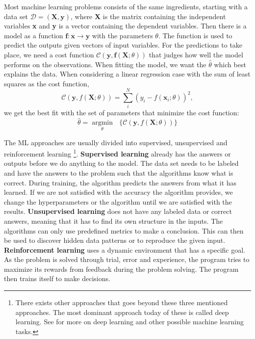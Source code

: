 \documentclass[a4paper, american, 12pt]{report}
\DeclareMathOperator*{\argmin}{argmin}
\begin{document}
	Most machine learning problems consists of the same ingredients, starting with a data set $\mathcal{D}=(\textbf{X}, \textbf{y})$, where \textbf{X} is the matrix containing the independent variables \textbf{x} and \textbf{y} is a vector containing the dependent variables. Then there is a model as a function $\textbf{f}:\textbf{x}\rightarrow\textbf{y}$ with the parameters $\theta$. The function is used to predict the outputs given vectors of input variables. For the predictions to take place, we need a cost function $\mathcal{C}(\textbf{y},\textbf{f}(\textbf{X};\theta))$ that judges how well the model performs on the observations. When fitting the model, we want the $\hat{\theta}$ which best explains the data. When considering a linear regression case with the sum of least squares as the cost function,
	\begin{equation}
	\label{eq:SumLeastSquares}
		\mathcal{C}(\textbf{y},f(\textbf{X};\theta))=\sum_{i}^{N}(y_i-f(\textbf{x}_i;\theta))^2,
	\end{equation}
	we get the best fit with the set of parameters that minimize the cost function:
	\begin{equation}
	\label{eq:MinCostFunc}
		\hat{\theta}=\underset{\theta}{\argmin}\text{ } \{\mathcal{C}(\textbf{y},f(\textbf{X};\theta))\}
	\end{equation}
	
	The ML approaches are usually divided into supervised, unsupervised and reinforcement learning \footnote{There exists other approaches that goes beyond these three mentioned approaches. The most dominant approach today of these is called deep learning. See \citet{Goodfellow-et-al-2016} for more on deep learning and other possible machine learning tasks.}. \textbf{Supervised learning} already has the answers or outputs before we do anything to the model. The data set needs to be labeled and have the answers to the problem such that the algorithms know what is correct. During training, the algorithm predicts the answers from what it has learned. If we are not satisfied with the accuracy the algorithm provides, we change the hyperparameters or the algorithm until we are satisfied with the results. \textbf{Unsupervised learning} does not have any labeled data or correct answers, meaning that it has to find its own structure in the inputs. The algorithms can only use predefined metrics to make a conclusion. This can then be used to discover hidden data patterns or to reproduce the given input. \textbf{Reinforcement learning} uses a dynamic environment that has a specific goal. As the problem is solved through trial, error and experience, the program tries to maximize its rewards from feedback during the problem solving. The program then trains itself to make decisions.
	
\end{document}
